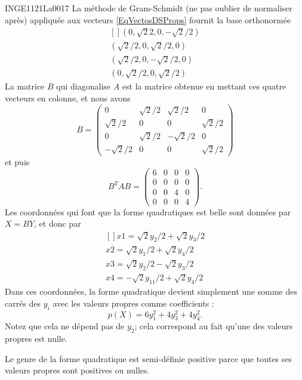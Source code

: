 \begin{corrige}{INGE1121La0017}
	La méthode de Gram-Schmidt (ne pas oublier de normaliser après) appliquée aux vecteurs \eqref{EqVectosDSProps} fournit la base orthonormée
	\begin{equation}
		\begin{aligned}[]
			(0, \sqrt{2}2, 0, -\sqrt{2}/2 )\\
			(\sqrt{2}/2, 0, \sqrt{2}/2, 0)\\
			(\sqrt{2}/2, 0, -\sqrt{2}/2, 0)\\
			(0, \sqrt{2}/2, 0, \sqrt{2}/2)
		\end{aligned}
	\end{equation}
	La matrice $B$ qui diagonalise $A$ est la matrice obtenue en mettant ces quatre vecteurs en colonne, et nous avons
	\begin{equation}
		B=\begin{pmatrix}
			0  		&	\sqrt{2}/2	&	 \sqrt{2}/2	&            0\\
			\sqrt{2}/2      &      0		&            0		& 	\sqrt{2}/2\\
			0		&	\sqrt{2}/2	&	-\sqrt{2}/2	&            0\\
			-\sqrt{2}/2	&            0		&            0		&	\sqrt{2}/2
		\end{pmatrix}
	\end{equation}
	et puis
	\begin{equation}
		B^TAB=
		\begin{pmatrix}
			 6	&	0	&	0	&	0	\\
			 0	&	0	&	0	&	0	\\
			 0	&	0	&	4	&	0	\\ 
			 0	&	0	&	0	&	4	 
		 \end{pmatrix}.
	\end{equation}
	Les coordonnées qui font que la forme quadratiques est belle sont données par $X=BY$, et donc par
	\begin{equation}
		\begin{aligned}[]
			x1 = \sqrt{2}y_2/2 + \sqrt{2}y_3/2\\
			x2 = \sqrt{2}y_1/2 + \sqrt{2}y_4/2\\
			x3 = \sqrt{2}y_2/2 - \sqrt{2}y_3/2\\
			x4 = -\sqrt{2}y_11/2 + \sqrt{2}y_4/2
		\end{aligned}
	\end{equation}
	Dans ces coordonnées, la forme quadratique devient simplement une somme des carrés des $y_i$ avec les valeurs propres comme coefficients :
	\begin{equation}
		p(X)=6y_1^2 + 4y_3^2 + 4y_4^2.
	\end{equation}
	Notez que cela ne dépend pas de $y_2$; cela correspond au fait qu'une des valeurs propres est nulle.

	Le genre de la forme quadratique est semi-définie positive parce que toutes ses valeurs propres sont positives ou nulles.	

\end{corrige}
